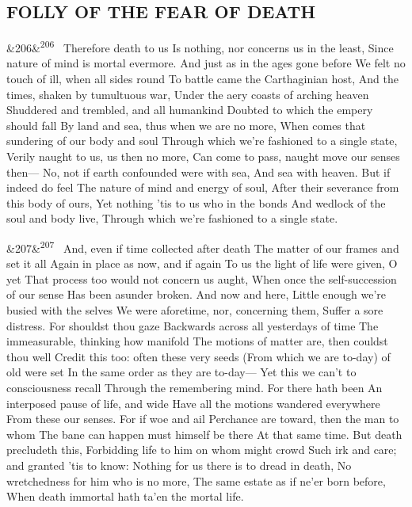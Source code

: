 \documentclass[12pt]{article}
\newcommand{\para}[1][]{\par\noindent\ifx&#1&\else\textsuperscript{\footnotesize #1}~\fi}
\begin{document}
\subsection*{FOLLY OF THE FEAR OF DEATH}

\para[206] Therefore death to us Is nothing, nor concerns us in the least, Since nature of mind is mortal evermore. And just as in the ages gone before We felt no touch of ill, when all sides round To battle came the Carthaginian host, And the times, shaken by tumultuous war, Under the aery coasts of arching heaven Shuddered and trembled, and all humankind Doubted to which the empery should fall By land and sea, thus when we are no more, When comes that sundering of our body and soul Through which we're fashioned to a single state, Verily naught to us, us then no more, Can come to pass, naught move our senses then--- No, not if earth confounded were with sea, And sea with heaven. But if indeed do feel The nature of mind and energy of soul, After their severance from this body of ours, Yet nothing 'tis to us who in the bonds And wedlock of the soul and body live, Through which we're fashioned to a single state.

\para[207] And, even if time collected after death The matter of our frames and set it all Again in place as now, and if again To us the light of life were given, O yet That process too would not concern us aught, When once the self-succession of our sense Has been asunder broken. And now and here, Little enough we're busied with the selves We were aforetime, nor, concerning them, Suffer a sore distress. For shouldst thou gaze Backwards across all yesterdays of time The immeasurable, thinking how manifold The motions of matter are, then couldst thou well Credit this too: often these very seeds (From which we are to-day) of old were set In the same order as they are to-day--- Yet this we can't to consciousness recall Through the remembering mind. For there hath been An interposed pause of life, and wide Have all the motions wandered everywhere From these our senses. For if woe and ail Perchance are toward, then the man to whom The bane can happen must himself be there At that same time. But death precludeth this, Forbidding life to him on whom might crowd Such irk and care; and granted 'tis to know: Nothing for us there is to dread in death, No wretchedness for him who is no more, The same estate as if ne'er born before, When death immortal hath ta'en the mortal life.
\end{document}
